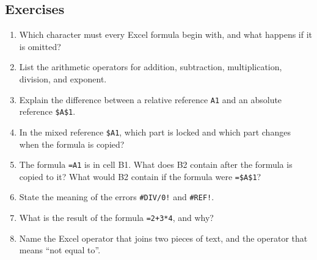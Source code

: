 \subsection*{Exercises}
\begin{enumerate}[label=\arabic*.]
  \item Which character must every Excel formula begin with, and what happens
    if it is omitted?
  \item List the arithmetic operators for addition, subtraction,
    multiplication, division, and exponent.
  \item Explain the difference between a relative reference \texttt{A1} and an
    absolute reference \texttt{\$A\$1}.
  \item In the mixed reference \texttt{\$A1}, which part is locked and which
    part changes when the formula is copied?
  \item The formula \texttt{=A1} is in cell B1. What does B2 contain after the
    formula is copied to it? What would B2 contain if the formula were
    \texttt{=\$A\$1}?
  \item State the meaning of the errors \texttt{\#DIV/0!} and
    \texttt{\#REF!}.
  \item What is the result of the formula \texttt{=2+3*4}, and why?
  \item Name the Excel operator that joins two pieces of text, and the operator
    that means ``not equal to''.
\end{enumerate}

